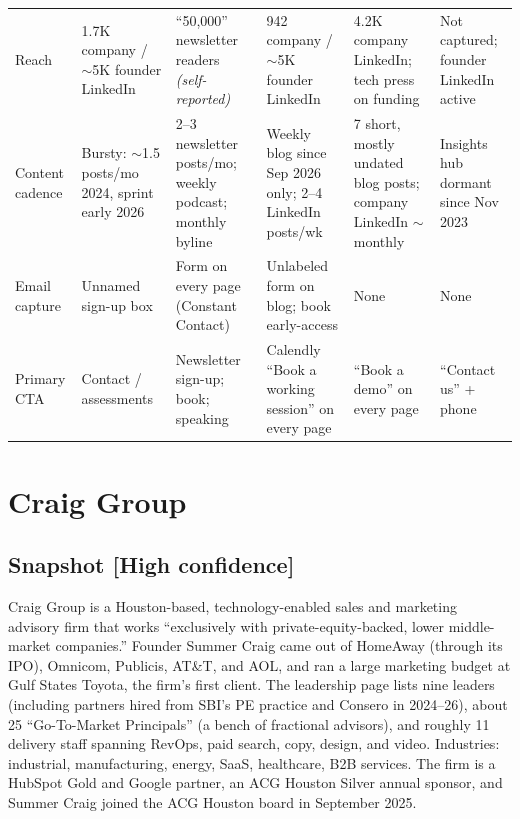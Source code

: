 \documentclass[11pt]{article}
\newcommand{\high}{\textcolor{green!45!black}{\textbf{[High confidence]}}}
\newcommand{\self}{\textcolor{gray!70!black}{\textit{(self-reported)}}}
\begin{document}
\begin{center}
\begin{longtable}{R{1.9cm} R{2.65cm} R{2.5cm} R{2.65cm} R{2.65cm} R{2.3cm}}
Reach & 1.7K company / $\sim$5K founder LinkedIn & ``50,000'' newsletter readers \self & 942 company / $\sim$5K founder LinkedIn & 4.2K company LinkedIn; tech press on funding & Not captured; founder LinkedIn active \\
Content cadence & Bursty: $\sim$1.5 posts/mo 2024, sprint early 2026 & 2--3 newsletter posts/mo; weekly podcast; monthly byline & Weekly blog since Sep 2026 only; 2--4 LinkedIn posts/wk & 7 short, mostly undated blog posts; company LinkedIn $\sim$monthly & Insights hub dormant since Nov 2023 \\
Email capture & Unnamed sign-up box & Form on every page (Constant Contact) & Unlabeled form on blog; book early-access & None & None \\
Primary CTA & Contact / assessments & Newsletter sign-up; book; speaking & Calendly ``Book a working session'' on every page & ``Book a demo'' on every page & ``Contact us'' + phone \\
\bottomrule
\end{longtable}
\end{center}

\section{Craig Group}

\subsection{Snapshot \high}
Craig Group is a Houston-based, technology-enabled sales and marketing advisory firm
that works ``exclusively with private-equity-backed, lower middle-market companies.''
Founder Summer Craig came out of HomeAway (through its IPO), Omnicom, Publicis, AT\&T,
and AOL, and ran a large marketing budget at Gulf States Toyota, the firm's first
client. The leadership page lists nine leaders (including partners hired from SBI's PE
practice and Consero in 2024--26), about 25 ``Go-To-Market Principals'' (a bench of
fractional advisors), and roughly 11 delivery staff spanning RevOps, paid search,
copy, design, and video. Industries: industrial, manufacturing, energy, SaaS,
healthcare, B2B services. The firm is a HubSpot Gold and Google partner, an ACG
Houston Silver annual sponsor, and Summer Craig joined the ACG Houston board in
September 2025.
\end{document}
